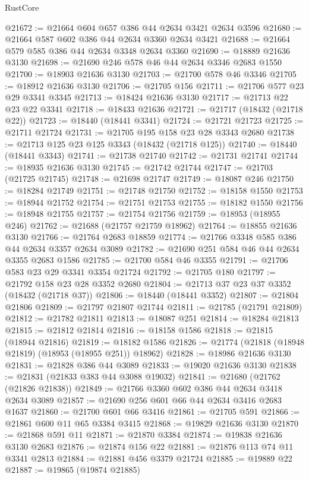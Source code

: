 \begin{lexlean}{RustCore}
\begin{coremodule}
@21672 := @21664 @604 @657 @386 @44 @2634 @3421 @2634 @3596
@21680 := @21664 @587 @602 @386 @44 @2634 @3360 @2634 @3421
@21688 := @21664 @579 @585 @386 @44 @2634 @3348 @2634 @3360
@21690 := @18889 @21636 @3130
@21698 := @21690 @246 @578 @46 @44 @2634 @3346 @2683 @1550
@21700 := @18903 @21636 @3130
@21703 := @21700 @578 @46 @3346
@21705 := @18912 @21636 @3130
@21706 := @21705 @156
@21711 := @21706 @577 @23 @29 @3341 @3345
@21713 := @18424 @21636 @3130
@21717 := @21713 @22 @23 @22 @3341
@21718 := @18433 @21636
@21721 := @21717 (@18432 (@21718 @22))
@21723 := @18440 (@18441 @3341)
@21724 := @21721 @21723
@21725 := @21711 @21724
@21731 := @21705 @195 @158 @23 @28 @3343 @2680
@21738 := @21713 @125 @23 @125 @3343 (@18432 (@21718 @125))
@21740 := @18440 (@18441 @3343)
@21741 := @21738 @21740
@21742 := @21731 @21741
@21744 := @18935 @21636 @3130
@21745 := @21742 @21744
@21747 := @21703 (@21725 @21745)
@21748 := @21698 @21747
@21749 := @18087 @246
@21750 := @18284 @21749
@21751 := @21748 @21750
@21752 := @18158 @1550
@21753 := @18944 @21752
@21754 := @21751 @21753
@21755 := @18182 @1550
@21756 := @18948 @21755
@21757 := @21754 @21756
@21759 := @18953 (@18955 @246)
@21762 := @21688 (@21757 @21759 @18962)
@21764 := @18855 @21636 @3130
@21766 := @21764 @2683 @18859
@21774 := @21766 @3348 @585 @386 @44 @2634 @3357 @2634 @3089
@21782 := @21690 @251 @584 @46 @44 @2634 @3355 @2683 @1586
@21785 := @21700 @584 @46 @3355
@21791 := @21706 @583 @23 @29 @3341 @3354 @21724
@21792 := @21705 @180
@21797 := @21792 @158 @23 @28 @3352 @2680
@21804 := @21713 @37 @23 @37 @3352 (@18432 (@21718 @37))
@21806 := @18440 (@18441 @3352)
@21807 := @21804 @21806
@21809 := @21797 @21807 @21744
@21811 := @21785 (@21791 @21809)
@21812 := @21782 @21811
@21813 := @18087 @251
@21814 := @18284 @21813
@21815 := @21812 @21814
@21816 := @18158 @1586
@21818 := @21815 (@18944 @21816)
@21819 := @18182 @1586
@21826 := @21774 (@21818 (@18948 @21819) (@18953 (@18955 @251)) @18962)
@21828 := @18986 @21636 @3130
@21831 := @21828 @386 @44 @3089
@21833 := @19020 @21636 @3130
@21838 := @21831 (@21833 @383 @44 @3088 @19032)
@21841 := @21680 (@21762 (@21826 @21838))
@21849 := @21766 @3360 @602 @386 @44 @2634 @3418 @2634 @3089
@21857 := @21690 @256 @601 @66 @44 @2634 @3416 @2683 @1637
@21860 := @21700 @601 @66 @3416
@21861 := @21705 @591
@21866 := @21861 @600 @11 @65 @3384 @3415
@21868 := @19829 @21636 @3130
@21870 := @21868 @591 @11
@21871 := @21870 @3384
@21874 := @19838 @21636 @3130 @2683
@21876 := @21874 @156 @22
@21881 := @21876 @113 @74 @11 @3341 @2813
@21884 := @21881 @456 @3379 @21724
@21885 := @19889 @22
@21887 := @19865 (@19874 @21885)

\end{coremodule}
\end{lexlean}
